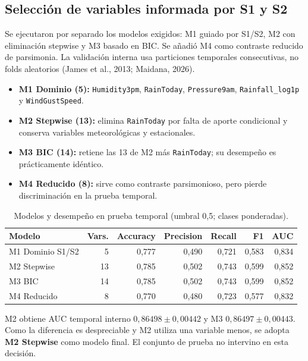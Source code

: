 \documentclass[10pt,a4paper]{article}
\newcommand{\code}[1]{\texttt{#1}}
\begin{document}
\subsection{Selección de variables informada por S1 y S2}
Se ejecutaron por separado los modelos exigidos: M1 guiado por S1/S2, M2 con eliminación stepwise y M3 basado en BIC. Se añadió M4 como contraste reducido de parsimonia. La validación interna usa particiones temporales consecutivas, no folds aleatorios (James et al., 2013; Maidana, 2026).

\begin{itemize}
\item \textbf{M1 Dominio (5):} \code{Humidity3pm}, \code{RainToday}, \code{Pressure9am}, \code{Rainfall\_log1p} y \code{WindGustSpeed}.
\item \textbf{M2 Stepwise (13):} elimina \code{RainToday} por falta de aporte condicional y conserva variables meteorológicas y estacionales.
\item \textbf{M3 BIC (14):} retiene las 13 de M2 más \code{RainToday}; su desempeño es prácticamente idéntico.
\item \textbf{M4 Reducido (8):} sirve como contraste parsimonioso, pero pierde discriminación en la prueba temporal.
\end{itemize}

\begin{table}[H]
\centering\scriptsize
\caption{Modelos y desempeño en prueba temporal (umbral 0,5; clases ponderadas).}
\begin{tabular}{lrrrrrr}
\toprule
Modelo & Vars. & Accuracy & Precision & Recall & F1 & AUC\\
\midrule
M1 Dominio S1/S2 & 5 & 0,777 & 0,490 & 0,721 & 0,583 & 0,834\\
M2 Stepwise & 13 & 0,785 & 0,502 & 0,743 & 0,599 & 0,852\\
M3 BIC & 14 & 0,785 & 0,502 & 0,743 & 0,599 & 0,852\\
M4 Reducido & 8 & 0,770 & 0,480 & 0,723 & 0,577 & 0,832\\
\bottomrule
\end{tabular}
\end{table}

M2 obtiene AUC temporal interno $0{,}86498\pm0{,}00442$ y M3 $0{,}86497\pm0{,}00443$. Como la diferencia es despreciable y M2 utiliza una variable menos, se adopta \textbf{M2 Stepwise} como modelo final. El conjunto de prueba no intervino en esta decisión.
\end{document}
